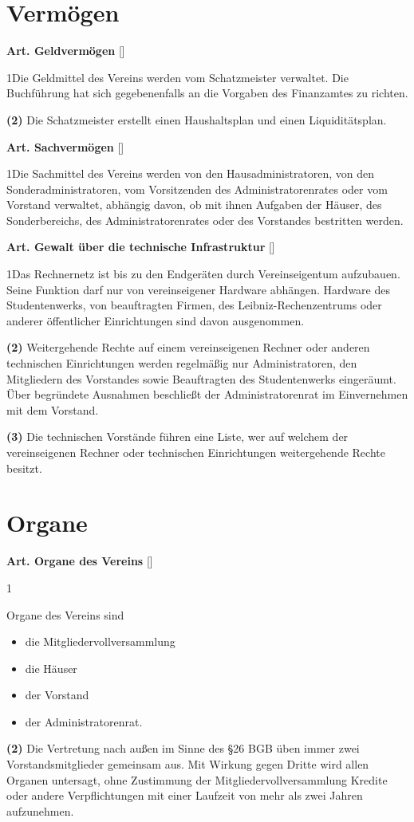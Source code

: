 \documentclass[12pt]{article}
\newcommand{\Abschnitt}[1]{\section{#1}}
\newcommand{\Satz}[2]{

\begin{samepage}
{\bf (#1)} #2
\end{samepage}
}
\newenvironment{Artikel}[2]{
\bigskip \centerline{{\bf Art. #1} [#2]}
\nopagebreak
}{
}
\begin{document}
\Abschnitt{Vermögen}

\begin{Artikel}{11}{Geldvermögen}

\Satz{1}{Die Geldmittel des Vereins werden vom Schatzmeister verwaltet.  Die
Buch\-führung hat sich gegebenenfalls an die Vorgaben des Finanzamtes zu
richten.}

\Satz{2}{Die Schatzmeister erstellt einen Haushaltsplan und einen
Liquiditätsplan.}

\end{Artikel}

\begin{Artikel}{12}{Sachvermögen}

\Satz{1}{Die Sachmittel des Vereins werden von den Hausadministratoren, von den
Sonderadministratoren, vom Vorsitzenden des Administratorenrates oder vom
Vorstand verwaltet, abhängig davon, ob mit ihnen Aufgaben der Häuser, des
Sonderbereichs, des Administratorenrates oder des Vorstandes bestritten werden.}

\end{Artikel}

\begin{Artikel}{13}{Gewalt über die technische Infrastruktur}

\Satz{1}{Das Rechnernetz ist bis zu den Endgeräten durch Vereinseigentum
aufzubauen. Seine Funktion darf nur von vereinseigener Hardware abhängen. 
Hardware des Studentenwerks, von beauftragten Firmen, des
Leibniz-Rechenzentrums oder anderer öffentlicher Einrichtungen sind davon
ausgenommen.}

\Satz{2}{Weitergehende Rechte auf einem vereinseigenen Rechner oder anderen
technischen Einrichtungen werden regelmäßig nur Administratoren, den
Mitgliedern des Vorstandes sowie Beauftragten des Studentenwerks eingeräumt.
Über begründete Ausnahmen beschließt der Administratorenrat im Einvernehmen mit
dem Vorstand.}

\Satz{3}{Die technischen Vorstände führen eine Liste, wer auf welchem der
vereinseigenen Rechner oder technischen Einrichtungen weitergehende Rechte
besitzt.}

\end{Artikel}

\Abschnitt{Organe}

\begin{Artikel}{14}{Organe des Vereins}

\Satz{1}{Organe des Vereins sind  
\begin{itemize}
\item die Mitgliedervollversammlung
\item die Häuser
\item der Vorstand
\item der Administratorenrat.
\end{itemize}}

\Satz{2}{Die Vertretung nach außen im Sinne des \S 26 BGB üben immer zwei
Vorstandsmitglieder gemeinsam aus. Mit Wirkung gegen Dritte wird allen Organen
untersagt, ohne Zustimmung der Mitgliedervollversammlung Kredite oder andere
Verpflichtungen mit einer Laufzeit von mehr als zwei Jahren aufzunehmen.}

\end{Artikel}
\end{document}
